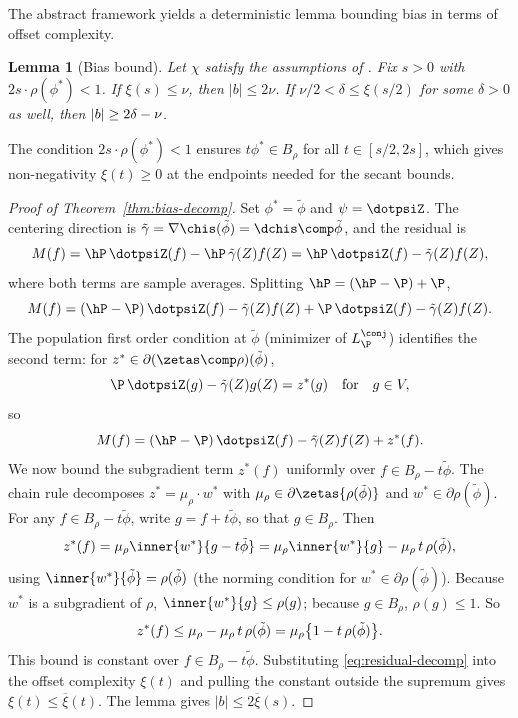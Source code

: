 \documentclass{article}
\newtheorem{lemma}[theorem]{Lemma}
\begin{document}
The abstract framework yields a deterministic lemma bounding bias in terms of offset complexity.

\begin{lemma}[Bias bound]
\label{lem:bias-bound}
Let $\chi$ satisfy the assumptions of . Fix $s > 0$ with $2s \cdot \rho(\phi^*) < 1$. If $\xi(s) \le \nu$, then $|b| \le 2\nu$. If $\nu/2 < \delta \le \xi(s/2)$ for some $\delta > 0$ as well, then $\abs{b} \ge 2\delta - \nu$.
\end{lemma}

The condition $2s \cdot \rho(\phi^*) < 1$ ensures $t\phi^* \in B_\rho$ for all $t \in [s/2, 2s]$, which gives non-negativity $\xi(t) \ge 0$ at the endpoints needed for the secant bounds.

\begin{proof}[Proof of Theorem~\ref{thm:bias-decomp}]
Set $\phi^* = \tilde\phi$ and $\psi = \dotpsiZ$. The centering direction is $\tilde\gamma = \nabla\chis(\tilde\phi) = \dchis \comp \tilde\phi$, and the residual is
\[
M(f) = \hP\, \dotpsiZ(f) - \hP\, \tilde\gamma(Z) f(Z) = \hP\, \dotpsiZ(f) - \tilde\gamma(Z) f(Z),
\]
where both terms are sample averages. Splitting $\hP = (\hP - \P) + \P$,
\[
M(f) = (\hP - \P)\, \dotpsiZ(f) - \tilde\gamma(Z) f(Z) + \P\, \dotpsiZ(f) - \tilde\gamma(Z) f(Z).
\]
The population first order condition at $\tilde\phi$ (minimizer of $L^\conj_{\P}$) identifies the second term: for $z^* \in \partial(\zetas \comp \rho)(\tilde\phi)$,
\begin{equation}
\label{eq:foc-population}
\P\, \dotpsiZ(g) - \tilde\gamma(Z) g(Z) = z^*(g) \qfor g \in V,
\end{equation}
so
\begin{equation}
\label{eq:residual-decomp}
M(f) = (\hP - \P)\, \dotpsiZ(f) - \tilde\gamma(Z) f(Z) + z^*(f).
\end{equation}
We now bound the subgradient term $z^*(f)$ uniformly over $f \in B_\rho - t\tilde\phi$. The chain rule decomposes $z^* = \mu_\rho \cdot w^*$ with $\mu_\rho \in \partial\zetas\{\rho(\tilde\phi)\}$ and $w^* \in \partial\rho(\tilde\phi)$. For any $f \in B_\rho - t\tilde\phi$, write $g = f + t\tilde\phi$, so that $g \in B_\rho$. Then
\[
z^*(f) = \mu_\rho\inner{w^*}{g - t\tilde\phi} = \mu_\rho\inner{w^*}{g} - \mu_\rho\, t\, \rho(\tilde\phi),
\]
using $\inner{w^*}{\tilde\phi} = \rho(\tilde\phi)$ (the norming condition for $w^* \in \partial\rho(\tilde\phi)$). Because $w^*$ is a subgradient of $\rho$, $\inner{w^*}{g} \le \rho(g)$; because $g \in B_\rho$, $\rho(g) \le 1$. So
\[
z^*(f) \le \mu_\rho - \mu_\rho\, t\, \rho(\tilde\phi) = \mu_\rho\qty{1 - t\,\rho(\tilde\phi)}.
\]
This bound is constant over $f \in B_\rho - t\tilde\phi$. Substituting \eqref{eq:residual-decomp} into the offset complexity $\xi(t)$ and pulling the constant outside the supremum gives $\xi(t) \le \overline\xi(t)$. The lemma gives $|b| \le 2\overline\xi(s)$.
\end{proof}
\end{document}

